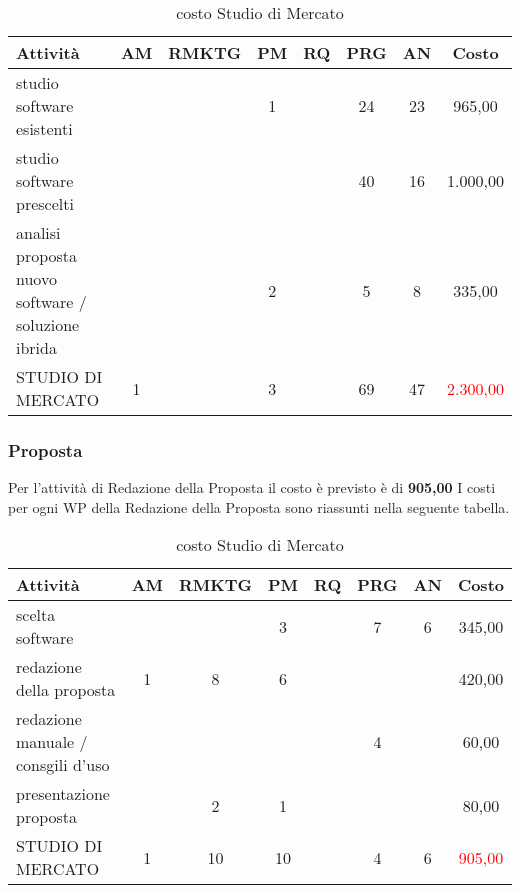 \begin{table}[!h]
\centering
\begin{tabular}{|l|c|c|c|c|c|c|c|}
\hline
\textbf{Attività}& \textbf{AM} & \textbf{RMKTG} & \textbf{PM} & \textbf{RQ} & \textbf{PRG} & \textbf{AN} & \textbf{Costo}  \\ 
              
\hline
studio software esistenti & & & 1& & 24& 23& \text{\euro} 965,00\\
studio software prescelti	 				  & & &	&	&40 &16 & \text{\euro} 1.000,00 \\	
 \parbox{162 px}{analisi proposta nuovo software / soluzione ibrida} 					  & & &2 & 	&5	&  8  &  	\text{\euro} 335,00 \\			  
\hline
STUDIO DI MERCATO  							& 1 &  &3 & &69	&47	&	\textcolor{red}{ \text{\euro}2.300,00 }\\		 
\hline
\end{tabular}
\caption{costo Studio di Mercato}\label{tab:mercato}
\end{table}







\subsubsection{Proposta}
Per l'attività di Redazione della Proposta il costo è previsto è di \textbf	{ \text{\euro} 905,00 }	
I costi per ogni WP della Redazione della Proposta sono riassunti nella seguente tabella.


\begin{table}[!h]
\centering
\begin{tabular}{|l|c|c|c|c|c|c|c|}
\hline
\textbf{Attività}& \textbf{AM} & \textbf{RMKTG} & \textbf{PM} & \textbf{RQ} & \textbf{PRG} & \textbf{AN} & \textbf{Costo}  \\ 
              
\hline

scelta software			& & & 3&	& 7&	6& 	\text{\euro} 345,00 \\
redazione della proposta & 1&	8&	6& & & & 	 \text{\euro} 420,00 \\
redazione manuale / consgili d'uso & & & & & 					4 && 	\text{\euro} 60,00 \\	
presentazione proposta		 & & 2&  	1	& & 	& & 		 \text{\euro} 80,00 \\	

	  
\hline
STUDIO DI MERCATO  							& 1  &10 &10& &	4&	6&	\textcolor{red}{ \text{\euro} 905,00 }\\		 
\hline
\end{tabular}
\caption{costo Studio di Mercato}\label{tab:mercato}
\end{table}	
	
